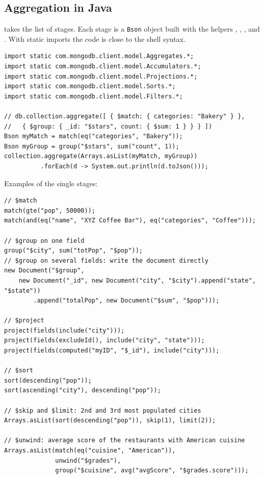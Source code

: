 \subsection{Aggregation in Java}
 takes the list of stages. Each stage is a \texttt{Bson} object built with the helpers , , ,  and . With static imports the code is close to the shell syntax.
\begin{lstlisting}
import static com.mongodb.client.model.Aggregates.*;
import static com.mongodb.client.model.Accumulators.*;
import static com.mongodb.client.model.Projections.*;
import static com.mongodb.client.model.Sorts.*;
import static com.mongodb.client.model.Filters.*;

// db.collection.aggregate([ { $match: { categories: "Bakery" } },
//   { $group: { _id: "$stars", count: { $sum: 1 } } } ])
Bson myMatch = match(eq("categories", "Bakery"));
Bson myGroup = group("$stars", sum("count", 1));
collection.aggregate(Arrays.asList(myMatch, myGroup))
          .forEach(d -> System.out.println(d.toJson()));
\end{lstlisting}

Examples of the single stages:
\begin{lstlisting}
// $match
match(gte("pop", 50000));
match(and(eq("name", "XYZ Coffee Bar"), eq("categories", "Coffee")));

// $group on one field
group("$city", sum("totPop", "$pop"));
// $group on several fields: write the document directly
new Document("$group",
    new Document("_id", new Document("city", "$city").append("state", "$state"))
        .append("totalPop", new Document("$sum", "$pop")));

// $project
project(fields(include("city")));
project(fields(excludeId(), include("city", "state")));
project(fields(computed("myID", "$_id"), include("city")));

// $sort
sort(descending("pop"));
sort(ascending("city"), descending("pop"));

// $skip and $limit: 2nd and 3rd most populated cities
Arrays.asList(sort(descending("pop")), skip(1), limit(2));

// $unwind: average score of the restaurants with American cuisine
Arrays.asList(match(eq("cuisine", "American")),
              unwind("$grades"),
              group("$cuisine", avg("avgScore", "$grades.score")));
\end{lstlisting}

